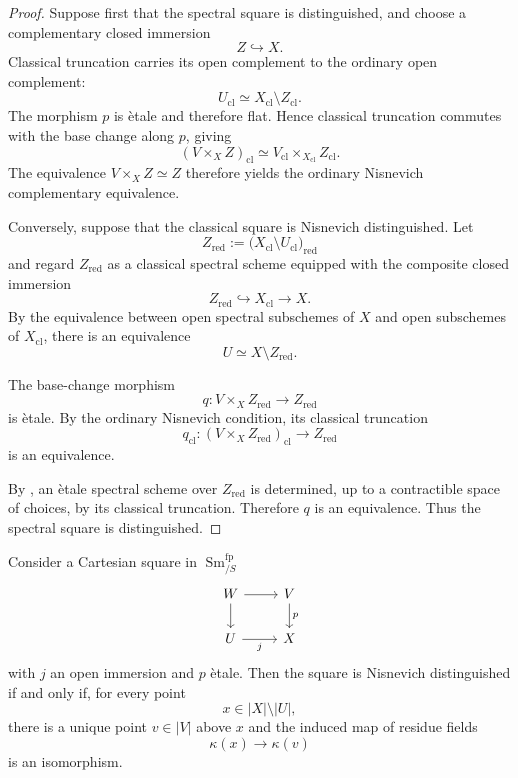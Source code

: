 \begin{proof}
Suppose first that the spectral square is distinguished, and choose a
complementary closed immersion
\[
    Z\hookrightarrow X.
\]
Classical truncation carries its open complement to the ordinary open
complement:
\[
    U_{\mathrm{cl}}
    \simeq
    X_{\mathrm{cl}}\setminus Z_{\mathrm{cl}}.
\]
The morphism $p$ is \`etale and therefore flat. Hence classical
truncation commutes with the base change along $p$, giving
\[
    (V\times_XZ)_{\mathrm{cl}}
    \simeq
    V_{\mathrm{cl}}
    \times_{X_{\mathrm{cl}}}
    Z_{\mathrm{cl}}.
\]
The equivalence $V\times_XZ\simeq Z$ therefore yields the ordinary
Nisnevich complementary equivalence.

Conversely, suppose that the classical square is Nisnevich
distinguished. Let
\[
    Z_{\mathrm{red}}
    :=
    \bigl(
        X_{\mathrm{cl}}
        \setminus
        U_{\mathrm{cl}}
    \bigr)_{\mathrm{red}}
\]
and regard $Z_{\mathrm{red}}$ as a classical spectral scheme equipped
with the composite closed immersion
\[
    Z_{\mathrm{red}}
    \hookrightarrow
    X_{\mathrm{cl}}
    \longrightarrow
    X.
\]
By the equivalence between open spectral subschemes of $X$ and open
subschemes of $X_{\mathrm{cl}}$, there is an equivalence
\[
    U
    \simeq
    X\setminus Z_{\mathrm{red}}.
\]

The base-change morphism
\[
    q
    \colon
    V\times_XZ_{\mathrm{red}}
    \longrightarrow
    Z_{\mathrm{red}}
\]
is \`etale. By the ordinary Nisnevich condition, its classical
truncation
\[
    q_{\mathrm{cl}}
    \colon
    (V\times_XZ_{\mathrm{red}})_{\mathrm{cl}}
    \longrightarrow
    Z_{\mathrm{red}}
\]
is an equivalence.

By
,
an \`etale spectral scheme over $Z_{\mathrm{red}}$ is determined, up to
a contractible space of choices, by its classical truncation. Therefore
$q$ is an equivalence. Thus the spectral square is distinguished.
\end{proof}

\begin{proposition}
\label{prop:nisnevich-pointwise-criterion}
Consider a Cartesian square in $\operatorname{Sm}^{\mathrm{fp}}_{/S}$
\[
\begin{tikzcd}
    W \arrow[r] \arrow[d]
    &
    V \arrow[d,"p"]
    \\
    U \arrow[r,"j"']
    &
    X
\end{tikzcd}
\]
with $j$ an open immersion and $p$ \`etale. Then the square is
Nisnevich distinguished if and only if, for every point
\[
    x
    \in
    |X|\setminus|U|,
\]
there is a unique point $v\in|V|$ above $x$ and the induced map of
residue fields
\[
    \kappa(x)
    \longrightarrow
    \kappa(v)
\]
is an isomorphism.
\end{proposition}

